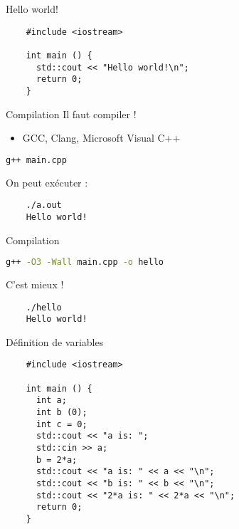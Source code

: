 
\begin{frame}[fragile]{Hello world!}
  \begin{lstlisting}
    #include <iostream>
    
    int main () {
      std::cout << "Hello world!\n";
      return 0;
    }
  \end{lstlisting}
\end{frame}

\begin{frame}[fragile]{Compilation}
  Il faut compiler !
  \begin{itemize}
    \item GCC, Clang, Microsoft Visual C++
  \end{itemize}

  \begin{lstlisting}[language=bash]
    g++ main.cpp
  \end{lstlisting}

  On peut exécuter :
  \begin{lstlisting}
    ./a.out
    Hello world!
  \end{lstlisting}
\end{frame}

\begin{frame}[fragile]{Compilation}
  \begin{lstlisting}[language=bash]
    g++ -O3 -Wall main.cpp -o hello
  \end{lstlisting}

  C'est mieux !
  \begin{lstlisting}
    ./hello
    Hello world!
  \end{lstlisting}
\end{frame}

\begin{frame}[fragile]{Définition de variables}
  \begin{lstlisting}
    #include <iostream>

    int main () {
      int a;
      int b (0);
      int c = 0;
      std::cout << "a is: ";
      std::cin >> a;
      b = 2*a;
      std::cout << "a is: " << a << "\n";
      std::cout << "b is: " << b << "\n";
      std::cout << "2*a is: " << 2*a << "\n";
      return 0;
    }
  \end{lstlisting}
\end{frame}

